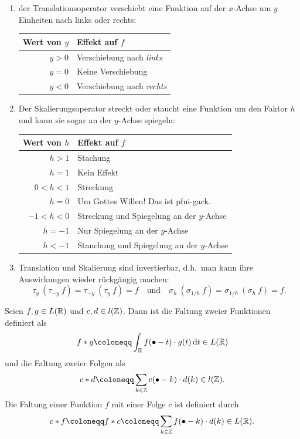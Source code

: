 \begin{remark} \leavevmode
\begin{enumerate}
\item der Translationsoperator verschiebt eine Funktion auf der $ x $-Achse um $ y $ Einheiten nach 
links oder rechts:
\par
\begin{center}
  \begin{tabular}{rl} \toprule
  Wert von $ y $ & Effekt auf $ f $ \\ \midrule
  $ y > 0 $ & Verschiebung nach \emph{links} \\
  $ y = 0 $ & Keine Verschiebung \\
  $ y < 0 $ & Verschiebung nach \emph{rechts} \\ \bottomrule
  \end{tabular}
\end{center}
\item Der Skalierungsoperator streckt oder staucht eine Funktion um den Faktor $ h $ und kann sie 
sogar an der $ y $-Achse spiegeln:\par
\begin{center}
  \begin{tabular}{rl} \toprule
  Wert von $ h $ & Effekt auf $ f $ \\ \midrule
  $ h > 1 $ & Stachung \\
  $ h = 1 $ & Kein Effekt \\
  $ 0 < h < 1 $ & Streckung \\ \midrule
  $ h = 0 $ & Um Gottes Willen! Das ist pfui-gack. \\ \midrule
  $ -1 < h < 0 $ & Streckung und Spiegelung an der $ y $-Achse \\
  $ h = -1 $ & Nur Spiegelung an der $ y $-Achse \\
  $ h < -1 $ & Stauchung und Spiegelung an der $ y $-Achse \\ \bottomrule
  \end{tabular}
\end{center}
\item Translation und Skalierung sind invertierbar, d.h.\ man kann ihre Auswirkungen wieder
rückgängig machen:
\[
  \tau_{y} \ (\tau_{-y} \ f) = \tau_{-y} \ (\tau_{y} \ f) = f \quad \text{und} \quad
  \sigma_{h} \ (\sigma_{1/h} \ f) = \sigma_{1/h} \ (\sigma_{h} \ f) = f.
\]
\end{enumerate}
\end{remark}

\begin{definition}[Faltung]
Seien $ f, g \in L(\mathbb{R}) $ und $ c,d \in l(\mathbb{Z}) $. Dann ist die Faltung zweier Funktionen definiert als
\[
  f * g \coloneqq \int_{\R} f(\bullet - t) \cdot g(t) \dif t \in L(\R)
\]
und die Faltung zweier Folgen als
\[
  c * d \coloneqq \sum_{k \in \Z} c(\bullet - k) \cdot d(k) \in l(\Z).
\]
Die Faltung einer Funktion $ f $ mit einer Folge $ c $ ist definiert durch
\[
  c * f \coloneqq f * c \coloneqq \sum_{k \in \Z} f(\bullet - k) \cdot d(k) \in L(\R).
\]
\end{definition}

